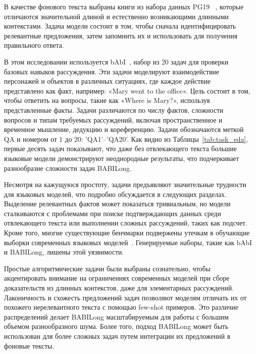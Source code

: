 В качестве фонового текста выбраны книги из набора данных PG19 ~\cite{rae2019compressive}, которые отличаются значительной длиной и естественно возникающими длинными контекстами. Задача модели состоит в том, чтобы сначала идентифицировать релевантные предложения, затем запомнить их и использовать для получения правильного ответа.

В этом исследовании используется bAbI~\cite{WestonBCM15}, набор из 20 задач для проверки базовых навыков рассуждения. Эти задачи моделируют взаимодействие персонажей и объектов в различных ситуациях, где каждое действие представлено как факт, например: «Mary went to the office». Цель состоит в том, чтобы ответить на вопросы, такие как «Where is Mary?», используя представленные факты. Задачи различаются по числу фактов, сложности вопросов и типам требуемых рассуждений, включая пространственное и временное мышление, дедукцию и кореференцию. Задачи обозначаются меткой QA и номером от 1 до 20: 'QA1'–'QA20'. Как видно из Таблицы~\ref{tab:task_eda}, первые десять задач показывают, что даже без отвлекающего текста большие языковые модели демонстрируют неоднородные результаты, что подчеркивает разнообразие сложности задач BABILong. %

Несмотря на кажущуюся простоту, задачи предъявляют значительные трудности для языковых моделей, что подробно обсуждается в следующих разделах. Выделение релевантных фактов может показаться тривиальным, но модели сталкиваются с проблемами при поиске подтверждающих данных среди отвлекающего текста или выполнении сложных рассуждений, таких как подсчет. Кроме того, многие существующие бенчмарки подвержены утечкам в обучающие выборки современных языковых моделей~\cite{sainz-etal-2023-nlp}. Генерируемые наборы, такие как bAbI и BABILong, лишены этой уязвимости.

Простые алгоритмические задачи были выбраны сознательно, чтобы акцентировать внимание на ограничениях современных моделей при сборе доказательств из длинных контекстов, даже для элементарных рассуждений. Лаконичность и схожесть предложений задач позволяют моделям отличать их от похожего нерелевантного текста с помощью few-shot примеров. Это различие распределений делает BABILong масштабируемым для работы с большим объемом разнообразного шума. Более того, подход BABILong может быть использован для более сложных задач путем интеграции их предложений в фоновые тексты.

